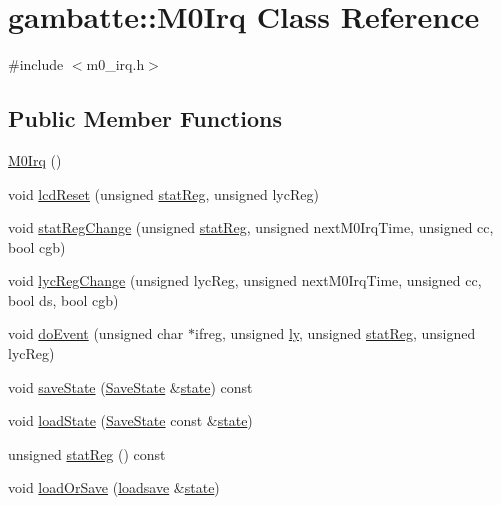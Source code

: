 \hypertarget{classgambatte_1_1M0Irq}{}\section{gambatte\+:\+:M0\+Irq Class Reference}
\label{classgambatte_1_1M0Irq}


{\ttfamily \#include $<$m0\+\_\+irq.\+h$>$}

\subsection*{Public Member Functions}
\begin{DoxyCompactItemize}
\item 
\hyperlink{classgambatte_1_1M0Irq_acb6a23bd7dc6672a0f283fe5eec37c77}{M0\+Irq} ()
\item 
void \hyperlink{classgambatte_1_1M0Irq_ad455897cbd44699ec22c0aaddb87bef8}{lcd\+Reset} (unsigned \hyperlink{classgambatte_1_1M0Irq_ac092e8454584b2c87ec70378fad0b5cd}{stat\+Reg}, unsigned lyc\+Reg)
\item 
void \hyperlink{classgambatte_1_1M0Irq_aa75e2697d3ceea08246e1f6e9fd05eea}{stat\+Reg\+Change} (unsigned \hyperlink{classgambatte_1_1M0Irq_ac092e8454584b2c87ec70378fad0b5cd}{stat\+Reg}, unsigned next\+M0\+Irq\+Time, unsigned cc, bool cgb)
\item 
void \hyperlink{classgambatte_1_1M0Irq_a78b93739ccd7c694a1c2dfc1dae1ff70}{lyc\+Reg\+Change} (unsigned lyc\+Reg, unsigned next\+M0\+Irq\+Time, unsigned cc, bool ds, bool cgb)
\item 
void \hyperlink{classgambatte_1_1M0Irq_af973cffcea506772d502c1286161a668}{do\+Event} (unsigned char $\ast$ifreg, unsigned \hyperlink{video_8cpp_ab1c1cf762ec2da5588c30a13cd60af91}{ly}, unsigned \hyperlink{classgambatte_1_1M0Irq_ac092e8454584b2c87ec70378fad0b5cd}{stat\+Reg}, unsigned lyc\+Reg)
\item 
void \hyperlink{classgambatte_1_1M0Irq_a1658924884d6e75567d06113ed97876d}{save\+State} (\hyperlink{structgambatte_1_1SaveState}{Save\+State} \&\hyperlink{ppu_8cpp_a2f2eca6997ee7baf8901725ae074d45b}{state}) const
\item 
void \hyperlink{classgambatte_1_1M0Irq_acdc4178a7b40d515a18ccc385de9e0c4}{load\+State} (\hyperlink{structgambatte_1_1SaveState}{Save\+State} const \&\hyperlink{ppu_8cpp_a2f2eca6997ee7baf8901725ae074d45b}{state})
\item 
unsigned \hyperlink{classgambatte_1_1M0Irq_ac092e8454584b2c87ec70378fad0b5cd}{stat\+Reg} () const
\item 
void \hyperlink{classgambatte_1_1M0Irq_a512e9ed1097d111db902a9fff479ad71}{load\+Or\+Save} (\hyperlink{classgambatte_1_1loadsave}{loadsave} \&\hyperlink{ppu_8cpp_a2f2eca6997ee7baf8901725ae074d45b}{state})
\end{DoxyCompactItemize}
